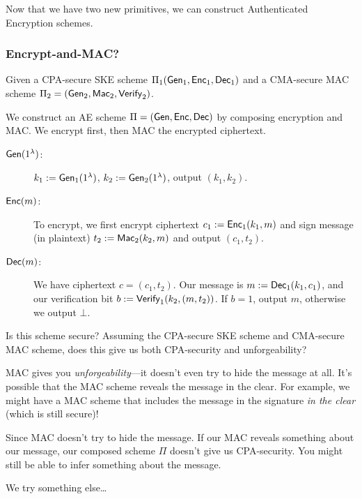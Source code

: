 
Now that we have two new primitives, we can construct Authenticated Encryption schemes.

\subsubsection{Encrypt-and-MAC?}
Given a CPA-secure SKE scheme $\Pi_1(\operatorname{\mathsf{Gen}}_1, \operatorname{\mathsf{Enc}}_1, \operatorname{\mathsf{Dec}}_1)$ and a CMA-secure MAC scheme $\Pi_2 = (\operatorname{\mathsf{Gen}}_2, \operatorname{\mathsf{Mac}}_2, \operatorname{\mathsf{Verify}}_2)$.

We construct an AE scheme $\Pi = (\operatorname{\mathsf{Gen}}, \operatorname{\mathsf{Enc}}, \operatorname{\mathsf{Dec}})$ by composing encryption and MAC. We encrypt first, then MAC the encrypted ciphertext.


\begin{description}
    \item[$\operatorname{\mathsf{Gen}}(1^\lambda)$:] $k_1:=\operatorname{\mathsf{Gen}}_1(1^\lambda)$, $k_2:=\operatorname{\mathsf{Gen}}_2(1^\lambda)$, output $(k_1, k_2)$.

    \item[$\operatorname{\mathsf{Enc}}(m)$:] To encrypt, we first encrypt ciphertext $c_1 := \operatorname{\mathsf{Enc}}_1(k_1, m)$ and sign message (in plaintext) $t_2 := \operatorname{\mathsf{Mac}}_2(k_2, m)$ and output $(c_1, t_2)$.

    \item[$\operatorname{\mathsf{Dec}}(m)$:] We have ciphertext $c = (c_1, t_2)$. Our message is $m:=\operatorname{\mathsf{Dec}}_1(k_1, c_1)$, and our verification bit $b := \operatorname{\mathsf{Verify}}_1(k_2, (m, t_2))$. If $b = 1$, output $m$, otherwise we output $\bot$.
\end{description}

\begin{ques*}
    Is this scheme secure? Assuming the CPA-secure SKE scheme and CMA-secure MAC scheme, does this give us both CPA-security and unforgeability?
\end{ques*}

MAC gives you \emph{unforgeability}---it doesn't even try to hide the message at all. It's possible that the MAC scheme reveals the message in the clear. For example, we might have a MAC scheme that includes the message in the signature \emph{in the clear} (which is still secure)!

Since MAC doesn't try to hide the message. If our MAC reveals something about our message, our composed scheme $\Pi$ doesn't give us CPA-security. You might still be able to infer something about the message.

We try something else\dots

